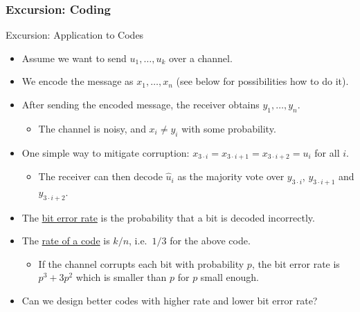\subsubsection{Excursion: Coding}

\begin{frame}{Excursion: Application to Codes}
    \begin{itemize}
        \item Assume we want to send $u_1,\ldots,u_k$ over a channel.
        \pause \item We encode the message as $x_1,\ldots, x_n$ (see below for possibilities how to do it).
        \pause \item After sending the encoded message, the receiver obtains $y_1,\ldots,y_n$.
        \begin{itemize}
            \pause \item The channel is noisy, and $x_i \neq y_i$ with some probability.
        \end{itemize}
        \pause \item One simple way to mitigate corruption: $x_{3 \cdot i} = x_{3 \cdot i + 1} = x_{3 \cdot i + 2} = u_i$ for all $i$.
        \begin{itemize}
        \item The receiver can then decode $\hat{u}_i$ as the majority vote over $y_{3\cdot i}$, $y_{3 \cdot i + 1}$ and $y_{3 \cdot i + 2}$.
        \end{itemize}
        \pause \item The \underline{bit error rate} is the probability that a bit is decoded incorrectly.
        \pause \item The \underline{rate of a code} is $k/n$, i.e.\ $1/3$ for the above code.
        \begin{itemize}
            \pause \item If the channel corrupts each bit with probability $p$, the bit error rate is $p^3 + 3p^2$ which is smaller than $p$ for $p$ small enough.
        \end{itemize}
        \pause \item Can we design better codes with higher rate and lower bit error rate?
    \end{itemize}
    \pause
    \begin{example}
        \label{example:parity-check-code}
            \begin{minipage}{0.49\textwidth}
            \begin{itemize}

\end{itemize}
\end{minipage}
\end{example}
\end{frame}

